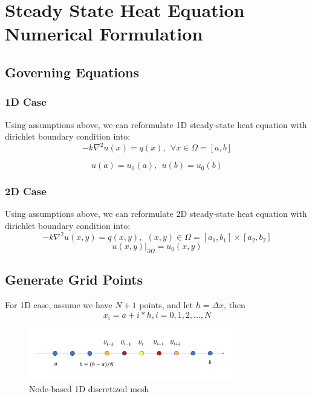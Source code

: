 \documentclass[a4paper]{article}
\begin{document}
\section{Steady State Heat Equation Numerical Formulation}
\subsection{Governing Equations}
\subsubsection{1D Case}
Using assumptions above, we can reformulate 1D steady-state heat equation with dirichlet boundary condition into:
\begin{equation}
    -k\nabla^2u(x) = q(x), ~~\forall x\in \Omega = [a,b]
\end{equation}

\begin{equation}
    u(a) = u_0(a), ~~u(b) = u_0(b)
\end{equation}

\subsubsection{2D Case}
Using assumptions above, we can reformulate 2D steady-state heat equation with dirichlet boundary condition into:
\begin{equation}
    -k\nabla^2u(x,y) = q(x,y), ~~(x,y)\in \Omega = [a_1,b_1] \times [a_2,b_2]
\end{equation}
\begin{equation}
    u(x,y)|_{\partial\Omega} = u_0(x,y)
\end{equation}

\subsection{Generate Grid Points}
For 1D case, assume we have $N+1$ points, and let $h=\Delta x$, then 
    $$x_i = a + i*h, i = 0,1,2,...,N$$
    
\begin{figure}[htbp]
\centering
\includegraphics[width=0.8\textwidth]{1d.png}
\caption{\label{1d}Node-based 1D discretized mesh}
\end{figure}
\end{document}
